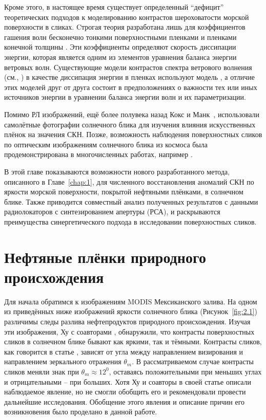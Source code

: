 Кроме этого, в настоящее время существует определенный ``дефицит'' теоретических подходов к моделированию контрастов шероховатости морской поверхности в сликах. Cтрогая теория разработана лишь для коэффициентов гашения волн бесконечно тонкими поверхностными пленками \citep{Levich1959} и пленками конечной толщины \citep{Jenkins1997}. Эти коэффициенты определяют скорость диссипации энергии, которая является одним из элементов уравнения баланса энергии ветровых волн. Существующие модели контрастов спектра ветрового волнения (см., \citep{Ermakov1987, Ermakov1992, Alpers1989, Gade1998}) в качестве диссипация энергии в пленках используют модель \citep{Levich1959}, а отличие этих моделей друг от друга состоит в предположениях о важности тех или иных источников энергии в уравнении баланса энергии волн и их параметризации.

Помимо РЛ изображений, ещё более полувека назад Кокс и Манк~\citep{Cox1954, Cox1954a}, использовали самолётные фотографии солнечного блика для изучения влияния искусственных плёнок на значения СКН. Позже, возможность наблюдения поверхностных сликов по оптическим изображениям солнечного блика из космоса была продемонстрирована в многочисленных работах, например \citep{Brekke2005, Chust2007, Hu2009}.

В этой главе показываются возможности нового разработанного метода, описанного в Главе~\ref{chap:1}, для численного восстановления аномалий СКН по яркости морской поверхности, покрытой нефтяными плёнками, в солнечном блике. Также приводится совместный анализ полученных результатов с данными радиолокаторов с синтезированием апертуры (РСА), и раскрываются преимущества синергетического подхода в исследовании поверхностных сликов.



\section{Нефтяные плёнки природного происхождения} \label{sec:2.1}


Для начала обратимся к изображениям MODIS Мексиканского залива. На одном из приведённых ниже изображений яркости солнечного блика (Рисунок~\ref{fig:2.1}) различимы следы разлива нефтепродуктов природного происхождения. Изучая эти изображения, Ху с соавторами \citep{Hu2009}, обнаружили, что контрасты поверхностных сликов в солнечном блике бывают как яркими, так и тёмными. Контрасты сликов, как говорится в статье \citep{Hu2009}, зависят от угла между направлением визирования и направлением зеркального отражения $\theta _{m} $. В рассматриваемом случае контрасты сликов меняли знак при $\theta _{m} \approx 12^{0} $, оставаясь положительными при меньших углах и отрицательными -- при больших. Хотя Ху и соавторы в своей статье \citep{Hu2009} описали наблюдаемое явление, но не смогли обобщить его и рекомендовали провести дальнейшие исследования. Обобщение этого явления и описание причин его возникновения было проделано в данной работе.

